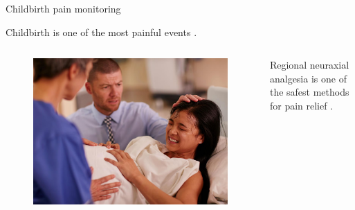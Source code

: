 \documentclass[aspectratio=169]{beamer}
\let\oldcite\cite %
\renewcommand{\cite}[1]{{\tiny\oldcite{#1}}}
\begin{document}
\begin{frame}[allowframebreaks]{Childbirth pain monitoring}
    
Childbirth is one of the most painful events {\tiny{\cite{WOS:000754419000014}}}.


\begin{columns}
\begin{figure}
    \centering
    \includegraphics[width=0.8\linewidth]{Figures/labour.png}
\end{figure}

\centering
{\color{blue} 
Regional neuraxial analgesia is one of the safest methods for pain relief {\tiny{\cite{WOS:000613005100038}}}. 
}
\end{columns}


\framebreak


\end{frame}
\end{document}
